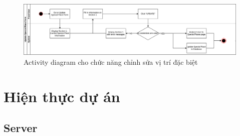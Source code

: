 \documentclass[a4paper]{article}
\begin{document}
\begin{figure}[!h]
    \includegraphics[width=14.7cm]{ActivityDiagram/EditSpecialPlace}
    \centering
    \caption{Activity diagram cho chức năng chỉnh sửa vị trí đặc biệt}
    \label{fig:activity_edit_special_place}
\end{figure}
\clearpage
\section{Hiện thực dự án}
\subsection{Server}
\end{document}
